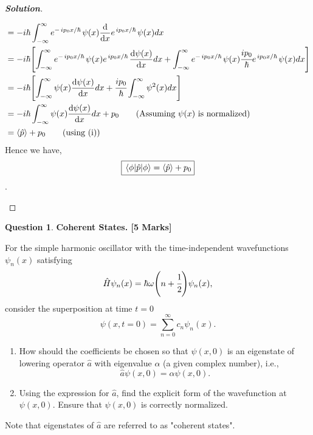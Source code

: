 \documentclass[10pt]{scrartcl}
\theoremstyle{definition}
\newtheorem{exercise}{Question}
\newenvironment{solution} {\begin{proof}[\normalfont \textbf{Solution}]} {\end{proof}}
\newcommand*{\Op}{\hat{p}}
\newcommand*{\OH}{\hat{H}}
\begin{document}
\begin{solution}
\begin{enumerate}[label=(\alph*)]
\begin{align*}
                                &= -i\hbar\int_{-\infty}^{\infty}  e^{-\flatfrac{ip_0x}{\hbar}}\psi(x) \dv{x}e^{\flatfrac{ip_0x}{\hbar}}\psi(x) dx \\ 
                                &= -i\hbar\qty[\int_{-\infty}^{\infty}  e^{-\flatfrac{ip_0x}{\hbar}}\psi(x) e^{\flatfrac{ip_0x}{\hbar}}\dv{\psi(x)}{x} dx + \int_{-\infty}^{\infty}  e^{-\flatfrac{ip_0x}{\hbar}}\psi(x) \cfrac{ip_0}{\hbar}e^{\flatfrac{ip_0x}{\hbar}}\psi(x) dx] \\ 
                                &= -i\hbar\qty[\int_{-\infty}^{\infty}  \psi(x) \dv{\psi(x)}{x} dx + \cfrac{ip_0}{\hbar}\int_{-\infty}^{\infty} \psi^2(x) dx] \\ 
                                &= -i\hbar\int_{-\infty}^{\infty}  \psi(x) \dv{\psi(x)}{x} dx + p_0 \tag{Assuming $\psi(x)$ is normalized}\\ 
                                &= \expval{\Op} + p_0 \tag{using (i)}
            \end{align*}
            Hence we have, $$\boxed{\ev{\Op}{\phi} = \expval{\Op} + p_0}$$.

    \end{enumerate}
\end{solution}
\begin{exercise}\textbf{Coherent States. [5 Marks]}

    For the simple harmonic oscillator with the time-independent wavefunctions $\psi_n(x)$ satisfying
    \begin{equation*}
        \OH \psi_n(x) = \hbar \omega \qty(n + \cfrac{1}{2}) \psi_n(x),
    \end{equation*}
    consider the superposition at time $t = 0$
    \begin{equation*}
        \psi(x, t = 0) = \sum_{n=0}^\infty c_n \psi_n(x).
    \end{equation*}
    \begin{enumerate}[label=(\alph*)]
        \item How should the coefficients be chosen so that $\psi(x, 0)$ is an eigenstate of lowering operator $\hat{a}$ with eigenvalue $\alpha$ (a given complex number), i.e.,
              \begin{equation*}
                  \hat{a} \psi(x, 0) = \alpha \psi(x, 0).
              \end{equation*}

        \item Using the expression for $\hat{a}$, find the explicit form of the wavefunction at $\psi(x, 0)$. Ensure that $\psi(x, 0)$ is correctly normalized.
    \end{enumerate}
    Note that eigenstates of $\hat{a}$ are referred to as "coherent states".
\end{exercise}
\end{document}
